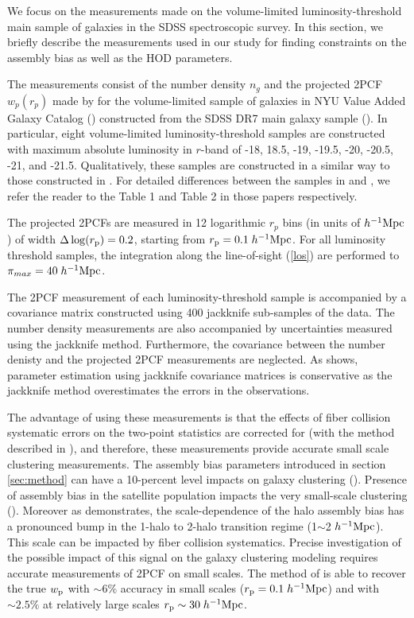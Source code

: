 \documentclass[12pt, preprint]{aastex}
\newcommand{\wpp}{w_{\rm p}}
\begin{document}
We focus on the measurements made on the volume-limited luminosity-threshold main sample of galaxies in the SDSS spectroscopic survey. In this section, we briefly describe the measurements used in our study for finding constraints on the assembly bias as well as the HOD parameters.

The measurements consist of the number density $n_{g}$ and the projected 2PCF $w_{p}(r_{p})$ made by \citet{guo2015} for the volume-limited sample of galaxies in NYU Value Added Galaxy Catalog (\citealt{Blanton2005}) constructed from the SDSS DR7 main galaxy sample (\citealt{abazajian2009}). In particular, eight volume-limited luminosity-threshold samples are constructed with maximum absolute luminosity in $r$-band of -18, 18.5, -19, -19.5, -20, -20.5, -21, and -21.5. Qualitatively, these samples are constructed in a similar way to those constructed in \citet{zehavi2011}. For detailed differences between the samples in \citet{guo2015} and \citet{zehavi2011}, we refer the reader to the Table 1 and Table 2 in those papers respectively. 


The projected 2PCFs are measured in 12 logarithmic $r_{p}$ bins (in units of $h^{-1}\rm{Mpc}$) of width $\Delta \log(r_{\rm p}) = 0.2$, starting from $r_{\rm{p}} = 0.1 \; h^{-1}\rm{Mpc}$. For all luminosity threshold samples, the integration along the line-of-sight (\ref{los}) are performed to $\pi_{max}=40 \; h^{-1}\rm{Mpc}$. 

The 2PCF measurement of each luminosity-threshold sample is accompanied by a covariance matrix constructed using 400 jackknife sub-samples of the data. The number density measurements are also accompanied by uncertainties measured using the jackknife method. Furthermore, the covariance between the number denisty and the projected 2PCF measurements are neglected. As \citet{norberg} shows, parameter estimation using jackknife covariance matrices is conservative as the jackknife method overestimates the errors in the observations. 

The advantage of using these measurements is that the effects of fiber collision systematic errors on the two-point statistics are corrected for (with the method described in \citealt{guo2012}), and therefore, these measurements provide accurate small scale clustering measurements. The assembly bias parameters introduced in section \ref{sec:method} can have a 10-percent level impacts on galaxy clustering (\citealt{decorated}). Presence of assembly bias in the satellite population impacts the very small-scale clustering (\citealt{decorated}). Moreover as \citet{sunayama2016} demonstrates, the scale-dependence of the halo assembly bias has a pronounced bump in the 1-halo to 2-halo transition regime (1$\sim$2 $h^{-1}\rm{Mpc}$). This scale can be impacted by fiber collision systematics. Precise investigation of the possible impact of this signal on the galaxy clustering modeling requires accurate measurements of 2PCF on small scales. 
The method of \citet{guo2012} is able to recover the true $\wpp$ with  $\sim 6\%$ accuracy in small scales ($r_{\rm{p}} = 0.1 \; h^{-1}\rm{Mpc}$) and with $\sim 2.5\%$ at relatively large scales $r_{\rm{p}} \sim 30 \; h^{-1}\rm{Mpc}$. 
\end{document}
